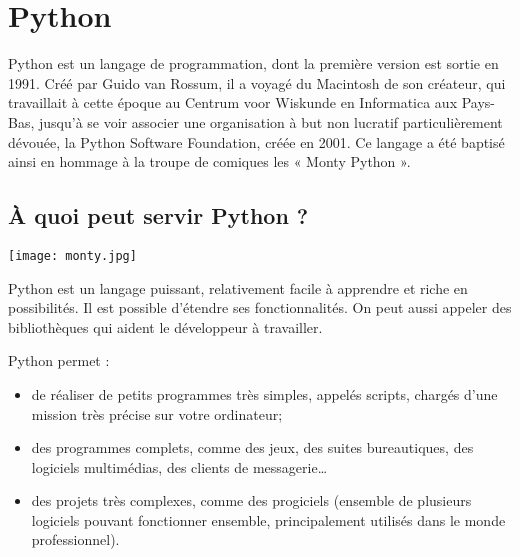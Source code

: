 \section{Python}


\begin{minipage}[c]{.79\linewidth}

Python est un langage de programmation, dont la première version est sortie en 1991. Créé par Guido van Rossum, il a voyagé du Macintosh de son créateur, qui travaillait à cette époque au Centrum voor Wiskunde en Informatica aux Pays-Bas, jusqu'à se voir associer une organisation à but non lucratif particulièrement dévouée, la Python Software Foundation, créée en 2001. Ce langage a été baptisé ainsi en hommage à la troupe de comiques les « Monty Python ».

\subsection{À quoi peut servir Python ?}
\end{minipage} \hfill
\begin{minipage}[c]{.2\linewidth}
\begin{center}
\texttt{[image: monty.jpg]}
\end{center}
\end{minipage}




Python est un langage puissant, relativement facile à apprendre et riche en possibilités. Il est possible d'étendre ses fonctionnalités. On peut aussi appeler des bibliothèques qui aident le développeur à travailler. 


Python permet :
\begin{itemize}
\item de réaliser de petits programmes très simples, appelés scripts, chargés d'une mission très précise sur votre ordinateur;
\item des programmes complets, comme des jeux, des suites bureautiques, des logiciels multimédias, des clients de messagerie…
\item des projets très complexes, comme des progiciels (ensemble de plusieurs logiciels pouvant fonctionner ensemble, principalement utilisés dans le monde professionnel).
\end{itemize}

